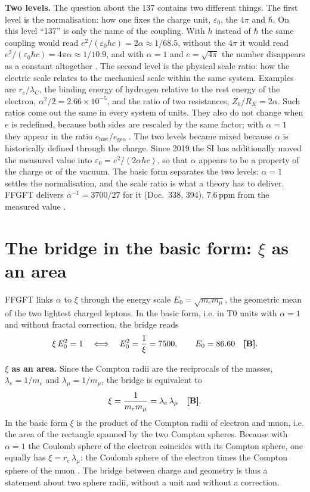\textbf{Two levels.} The question about the 137 contains two different things. The first level is
the normalisation: how one fixes the charge unit, $\varepsilon_0$, the $4\pi$ and $\hbar$. On this
level ``137'' is only the name of the coupling. With $h$ instead of $\hbar$ the same coupling would
read $e^2/(\varepsilon_0hc)=2\alpha\approx1/68.5$, without the $4\pi$ it would read
$e^2/(\varepsilon_0\hbar c)=4\pi\alpha\approx1/10.9$, and with $\alpha=1$ and $e=\sqrt{4\pi}$ the
number disappears as a constant altogether \QM. The second level is the physical scale ratio: how
the electric scale relates to the mechanical scale within the same system. Examples are
$r_e/\lambda_C$, the binding energy of hydrogen relative to the rest energy of the electron,
$\alpha^2/2=2.66\times10^{-5}$, and the ratio of two resistances, $Z_0/R_K=2\alpha$. Such ratios
come out the same in every system of units. They also do not change when $e$ is redefined, because
both sides are rescaled by the same factor; with $\alpha=1$ they appear in the ratio
$e_{\text{hist}}/e_{\text{geo}}$ \BM. The two levels became mixed because $\alpha$ is historically
defined through the charge. Since 2019 the SI has additionally moved the measured value into
$\varepsilon_0=e^2/(2\alpha hc)$, so that $\alpha$ appears to be a property of the charge or of the
vacuum. The basic form separates the two levels: $\alpha=1$ settles the normalisation, and the scale
ratio is what a theory has to deliver. FFGFT delivers $\alpha^{-1}=3700/27$ for it (Doc.~338, 394),
$7.6$\,ppm from the measured value \KM.

\section{The bridge in the basic form: \texorpdfstring{$\xi$}{xi} as an area}

FFGFT links $\alpha$ to $\xi$ through the energy scale $E_0=\sqrt{m_em_\mu}$, the geometric mean
of the two lightest charged leptons. In the basic form, i.e. in T0 units with $\alpha=1$ and
without fractal correction, the bridge reads
\begin{equation}
  \xi\,E_0^2=1\quad\Longleftrightarrow\quad E_0^2=\frac1\xi=7500,\qquad E_0=86.60
  \quad\textbf{[B]} .
\end{equation}

\textbf{$\xi$ as an area.} Since the Compton radii are the reciprocals of the masses,
$\lambda_e=1/m_e$ and $\lambda_\mu=1/m_\mu$, the bridge is equivalent to
\begin{equation}
  \xi=\frac{1}{m_em_\mu}=\lambda_e\,\lambda_\mu\quad\textbf{[B]} .
\end{equation}
In the basic form $\xi$ is the product of the Compton radii of electron and muon, i.e. the area of
the rectangle spanned by the two Compton spheres. Because with $\alpha=1$ the Coulomb sphere of the
electron coincides with its Compton sphere, one equally has $\xi=r_e\,\lambda_\mu$: the Coulomb
sphere of the electron times the Compton sphere of the muon \BM. The bridge between charge and
geometry is thus a statement about two sphere radii, without a unit and without a correction.

